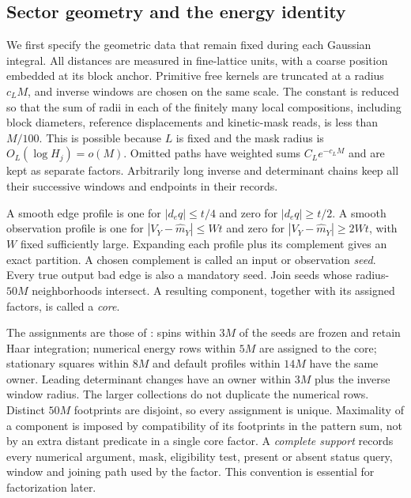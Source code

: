 \subsection{Sector geometry and the energy identity}
\label{subsec:rg-sectors}

We first specify the geometric data that remain fixed during each
Gaussian integral.  All distances are measured in fine-lattice units,
with a coarse position embedded at its block anchor.  Primitive free
kernels are truncated at a radius $c_LM$, and inverse windows are
chosen on the same scale.  The constant is reduced so that the sum of
radii in each of the finitely many local compositions, including block
diameters, reference displacements and kinetic-mask reads, is less
than $M/100$.  This is possible because $L$ is fixed and the mask
radius is $O_L(\log H_j)=o(M)$.  Omitted paths have weighted sums
$C_Le^{-c_LM}$ and are kept as separate factors.  Arbitrarily long
inverse and determinant chains keep all their successive windows and
endpoints in their records.

A smooth edge profile is one for $|d_eq|\le t/4$ and zero for
$|d_eq|\ge t/2$.  A smooth observation profile is one for
$|V_Y-\widehat m_Y|\le Wt$ and zero for
$|V_Y-\widehat m_Y|\ge2Wt$, with $W$ fixed sufficiently large.
Expanding each profile plus its complement gives an exact partition.
A chosen complement is called an input or observation \emph{seed}.
Every true output bad edge is also a mandatory seed.  Join seeds whose
radius-$50M$ neighborhoods intersect.  A resulting component, together
with its assigned factors, is called a \emph{core}.

The assignments are those of : spins within
$3M$ of the seeds are frozen and retain Haar integration; numerical
energy rows within $5M$ are assigned to the core; stationary squares
within $8M$ and default profiles within $14M$ have the same owner.
Leading determinant changes have an owner within $3M$ plus the inverse
window radius.  The larger collections do not duplicate the numerical
rows.  Distinct $50M$ footprints are disjoint, so every assignment is
unique.  Maximality of a component is imposed by compatibility of its
footprints in the pattern sum, not by an extra distant predicate in a
single core factor.  A \emph{complete support} records every numerical
argument, mask, eligibility test, present or absent status query,
window and joining path used by the factor.  This convention is
essential for factorization later.

